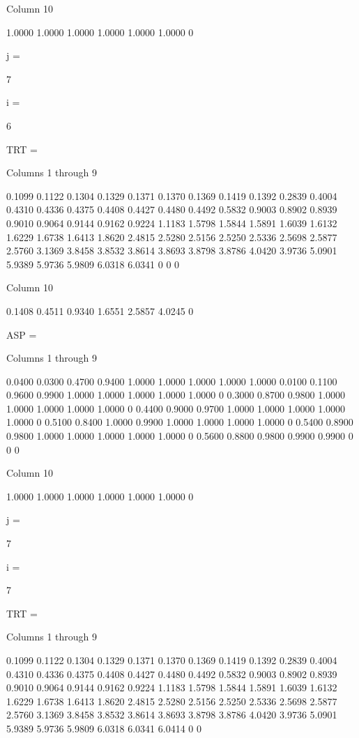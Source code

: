  Column 10

    1.0000
    1.0000
    1.0000
    1.0000
    1.0000
    1.0000
         0


j =

     7


i =

     6


TRT =

  Columns 1 through 9

    0.1099    0.1122    0.1304    0.1329    0.1371    0.1370    0.1369    0.1419    0.1392
    0.2839    0.4004    0.4310    0.4336    0.4375    0.4408    0.4427    0.4480    0.4492
    0.5832    0.9003    0.8902    0.8939    0.9010    0.9064    0.9144    0.9162    0.9224
    1.1183    1.5798    1.5844    1.5891    1.6039    1.6132    1.6229    1.6738    1.6413
    1.8620    2.4815    2.5280    2.5156    2.5250    2.5336    2.5698    2.5877    2.5760
    3.1369    3.8458    3.8532    3.8614    3.8693    3.8798    3.8786    4.0420    3.9736
    5.0901    5.9389    5.9736    5.9809    6.0318    6.0341         0         0         0

  Column 10

    0.1408
    0.4511
    0.9340
    1.6551
    2.5857
    4.0245
         0


ASP =

  Columns 1 through 9

    0.0400    0.0300    0.4700    0.9400    1.0000    1.0000    1.0000    1.0000    1.0000
    0.0100    0.1100    0.9600    0.9900    1.0000    1.0000    1.0000    1.0000    1.0000
         0    0.3000    0.8700    0.9800    1.0000    1.0000    1.0000    1.0000    1.0000
         0    0.4400    0.9000    0.9700    1.0000    1.0000    1.0000    1.0000    1.0000
         0    0.5100    0.8400    1.0000    0.9900    1.0000    1.0000    1.0000    1.0000
         0    0.5400    0.8900    0.9800    1.0000    1.0000    1.0000    1.0000    1.0000
         0    0.5600    0.8800    0.9800    0.9900    0.9900         0         0         0

  Column 10

    1.0000
    1.0000
    1.0000
    1.0000
    1.0000
    1.0000
         0


j =

     7


i =

     7


TRT =

  Columns 1 through 9

    0.1099    0.1122    0.1304    0.1329    0.1371    0.1370    0.1369    0.1419    0.1392
    0.2839    0.4004    0.4310    0.4336    0.4375    0.4408    0.4427    0.4480    0.4492
    0.5832    0.9003    0.8902    0.8939    0.9010    0.9064    0.9144    0.9162    0.9224
    1.1183    1.5798    1.5844    1.5891    1.6039    1.6132    1.6229    1.6738    1.6413
    1.8620    2.4815    2.5280    2.5156    2.5250    2.5336    2.5698    2.5877    2.5760
    3.1369    3.8458    3.8532    3.8614    3.8693    3.8798    3.8786    4.0420    3.9736
    5.0901    5.9389    5.9736    5.9809    6.0318    6.0341    6.0414         0         0

